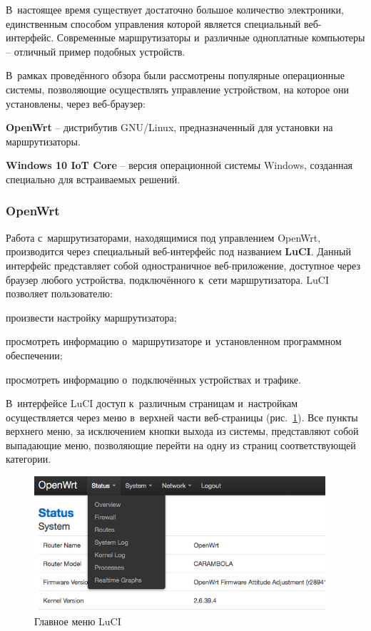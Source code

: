 В~настоящее время существует достаточно большое количество электроники, единственным способом управления которой является специальный веб-интерфейс. Современные маршрутизаторы и~различные одноплатные компьютеры -- отличный пример подобных устройств. \par

В~рамках проведённого обзора были рассмотрены популярные операционные системы, позволяющие осуществлять управление устройством, на которое они установлены, через веб-браузер:

\begin{dashitemize}
  \item \textbf{OpenWrt} -- дистрибутив GNU/Linux, предназначенный для установки на маршрутизаторы.
  \item \textbf{Windows 10 IoT Core} -- версия операционной системы Windows, созданная специально для встраиваемых решений.
\end{dashitemize}

\subsubsection{OpenWrt}

Работа с~маршрутизаторами, находящимися под управлением OpenWrt, производится через специальный веб-интерфейс под названием \textbf{LuCI}. Данный интерфейс представляет собой одностраничное веб-приложение, доступное через браузер любого устройства, подключённого к~сети маршрутизатора. LuCI позволяет пользователю:

\begin{dashitemize}
  \item произвести настройку маршрутизатора;
  \item просмотреть информацию о~маршрутизаторе и~установленном программном обеспечении;
  \item просмотреть информацию о~подключённых устройствах и трафике.
\end{dashitemize}

В~интерфейсе LuCI доступ к~различным страницам и~настройкам осуществляется через меню в~верхней части веб-страницы (рис.~\ref{fig:openwrt-menu}). Все пункты верхнего меню, за исключением кнопки выхода из системы, представляют собой выпадающие меню, позволяющие перейти на одну из страниц соответствующей категории.

\begin{figure}[h!]
  \centering
  \includegraphics[height=5cm]{img/openwrt-menu}
  \vspace*{12pt}
  \caption{Главное меню LuCI}\label{fig:openwrt-menu}
\end{figure}

